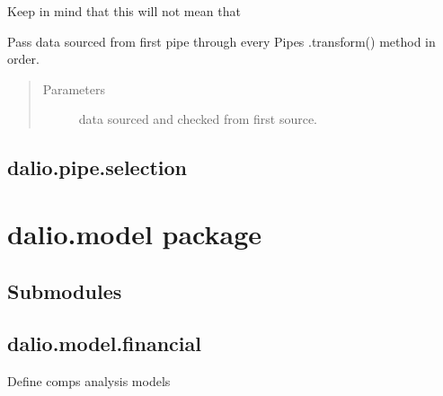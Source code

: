 \documentclass[letterpaper,10pt,english]{sphinxmanual}
\begin{document}
\begin{fulllineitems}
\begin{fulllineitems}
Keep in mind that this will not mean that

\end{fulllineitems}


\begin{fulllineitems}
\label{\detokenize{dalio.pipe:dalio.pipe.pipe.PipeLine.transform}}
Pass data sourced from first pipe through every Pipe\textasciigrave{}s
.transform() method in order.
\begin{quote}\begin{description}
\item[{Parameters}] \leavevmode
{} \textendash{} data sourced and checked from first source.

\end{description}\end{quote}

\end{fulllineitems}


\end{fulllineitems}



\section{dalio.pipe.selection}
\label{\detokenize{dalio.pipe:dalio-pipe-selection}}

\chapter{dalio.model package}
\label{\detokenize{dalio.model:dalio-model-package}}\label{\detokenize{dalio.model::doc}}

\section{Submodules}
\label{\detokenize{dalio.model:submodules}}

\section{dalio.model.financial}
\label{\detokenize{dalio.model:module-dalio.model.financial}}\label{\detokenize{dalio.model:dalio-model-financial}}
Define comps analysis models
\end{document}
